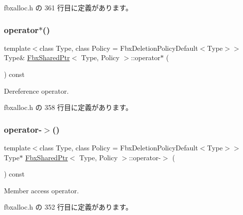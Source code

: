  fbxalloc.\+h の 361 行目に定義があります。

\mbox{\label{class_fbx_shared_ptr_afc7cbb06097e354e016dbc58a2bd06a4}} 
\subsubsection{\texorpdfstring{operator$\ast$()}{operator*()}}
{\footnotesize\ttfamily template$<$class Type, class Policy = Fbx\+Deletion\+Policy\+Default$<$\+Type$>$$>$ \\
Type\& \hyperlink{class_fbx_shared_ptr}{Fbx\+Shared\+Ptr}$<$ Type, Policy $>$\+::operator$\ast$ (\begin{DoxyParamCaption}{ }\end{DoxyParamCaption}) const\hspace{0.3cm}{\ttfamily [inline]}}



Dereference operator. 



 fbxalloc.\+h の 358 行目に定義があります。

\mbox{\label{class_fbx_shared_ptr_ab52fbd8433b61e009074282c88814f7c}} 
\subsubsection{\texorpdfstring{operator-\/$>$()}{operator->()}}
{\footnotesize\ttfamily template$<$class Type, class Policy = Fbx\+Deletion\+Policy\+Default$<$\+Type$>$$>$ \\
Type$\ast$ \hyperlink{class_fbx_shared_ptr}{Fbx\+Shared\+Ptr}$<$ Type, Policy $>$\+::operator-\/$>$ (\begin{DoxyParamCaption}{ }\end{DoxyParamCaption}) const\hspace{0.3cm}{\ttfamily [inline]}}



Member access operator. 



 fbxalloc.\+h の 352 行目に定義があります。

\mbox{\label{class_fbx_shared_ptr_aab1f664cd0b649231f359554129a1dc5}} 
